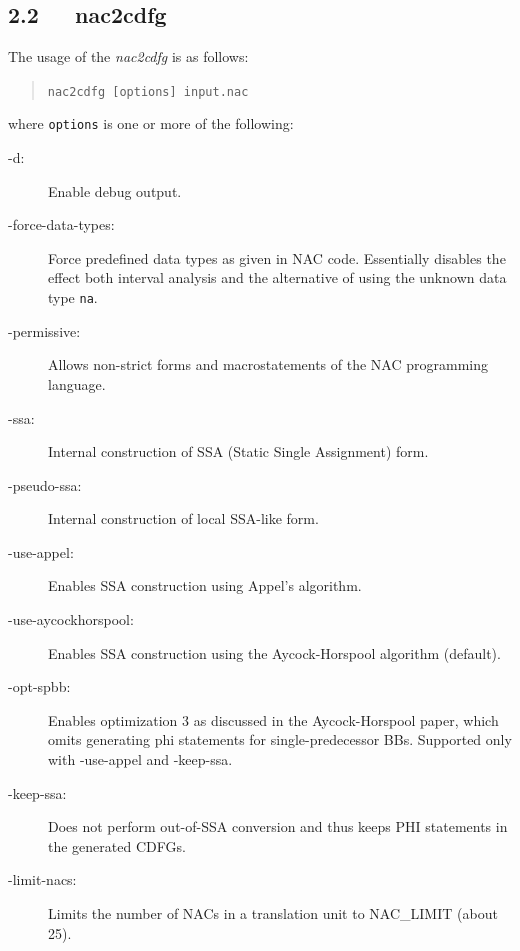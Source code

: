 \documentclass[a4paper]{article}
\providecommand*{\DUroletitlereference}[1]{\textsl{#1}}
\begin{document}
\subsection{2.2~~~nac2cdfg%
  \label{nac2cdfg}%
}

The usage of the \DUroletitlereference{nac2cdfg} is as follows:
%
\begin{quote}

\texttt{nac2cdfg {[}options{]} input.nac}

\end{quote}

where \texttt{options} is one or more of the following:
%
\begin{description}
\item[{-d:}] \leavevmode 
Enable debug output.

\item[{-force-data-types:}] \leavevmode 
Force predefined data types as given in NAC code. Essentially
disables the effect both interval analysis and the alternative
of using the unknown data type \texttt{na}.

\item[{-permissive:}] \leavevmode 
Allows non-strict forms and macrostatements of the NAC programming
language.

\item[{-ssa:}] \leavevmode 
Internal construction of SSA (Static Single Assignment) form.

\item[{-pseudo-ssa:}] \leavevmode 
Internal construction of local SSA-like form.

\item[{-use-appel:}] \leavevmode 
Enables SSA construction using Appel's algorithm.

\item[{-use-aycockhorspool:}] \leavevmode 
Enables SSA construction using the Aycock-Horspool algorithm (default).

\item[{-opt-spbb:}] \leavevmode 
Enables optimization 3 as discussed in the Aycock-Horspool paper,
which omits generating phi statements for single-predecessor BBs.
Supported only with -use-appel and -keep-ssa.

\item[{-keep-ssa:}] \leavevmode 
Does not perform out-of-SSA conversion and thus keeps PHI statements
in the generated CDFGs.

\item[{-limit-nacs:}] \leavevmode 
Limits the number of NACs in a translation unit to NAC\_LIMIT (about 25).


\end{description}
\end{document}
